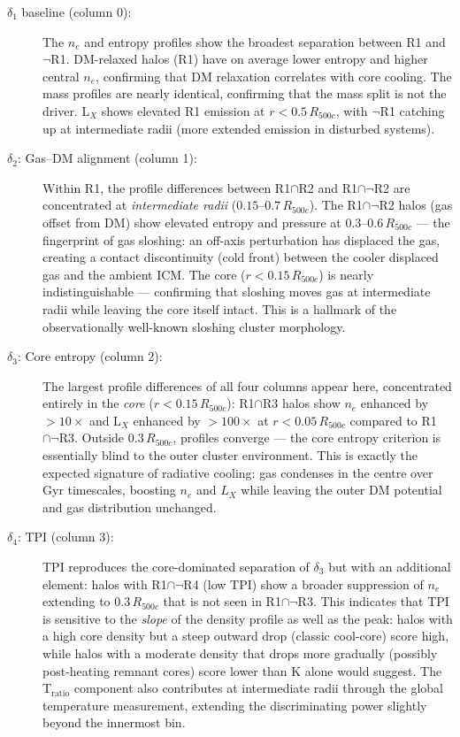 \documentclass[12pt,a4paper]{article}
\begin{document}
\begin{description}
  \item[$\delta_1$ baseline (column 0):]
    The $n_e$ and entropy profiles show the broadest separation between R1 and $\neg$R1.
    DM-relaxed halos (R1) have on average lower entropy and higher central $n_e$,
    confirming that DM relaxation correlates with core cooling.
    The mass profiles are nearly identical, confirming that the mass split
    is not the driver.
    L$_X$ shows elevated R1 emission at $r < 0.5\,R_{500c}$, with $\neg$R1 catching
    up at intermediate radii (more extended emission in disturbed systems).

  \item[$\delta_2$: Gas--DM alignment (column 1):]
    Within R1, the profile differences between R1$\cap$R2 and R1$\cap\neg$R2 are
    concentrated at \emph{intermediate radii} ($0.15$--$0.7\,R_{500c}$).
    The R1$\cap\neg$R2 halos (gas offset from DM) show elevated entropy and pressure
    at $0.3$--$0.6\,R_{500c}$ --- the fingerprint of gas sloshing: an off-axis perturbation
    has displaced the gas, creating a contact discontinuity (cold front) between the
    cooler displaced gas and the ambient ICM.
    The core ($r < 0.15\,R_{500c}$) is nearly indistinguishable --- confirming that
    sloshing moves gas at intermediate radii while leaving the core itself intact.
    This is a hallmark of the observationally well-known sloshing cluster morphology.

  \item[$\delta_3$: Core entropy (column 2):]
    The largest profile differences of all four columns appear here, concentrated
    entirely in the \emph{core} ($r < 0.15\,R_{500c}$):
    R1$\cap$R3 halos show $n_e$ enhanced by $>10\times$ and L$_X$ enhanced by
    $>100\times$ at $r < 0.05\,R_{500c}$ compared to R1$\cap\neg$R3.
    Outside $0.3\,R_{500c}$, profiles converge --- the core entropy criterion
    is essentially blind to the outer cluster environment.
    This is exactly the expected signature of radiative cooling: gas condenses
    in the centre over Gyr timescales, boosting $n_e$ and $L_X$ while leaving
    the outer DM potential and gas distribution unchanged.

  \item[$\delta_4$: TPI (column 3):]
    TPI reproduces the core-dominated separation of $\delta_3$ but with an additional
    element: halos with R1$\cap\neg$R4 (low TPI) show a broader suppression of
    $n_e$ extending to $0.3\,R_{500c}$ that is not seen in R1$\cap\neg$R3.
    This indicates that TPI is sensitive to the \emph{slope} of the density profile
    as well as the peak: halos with a high core density but a steep outward drop
    (classic cool-core) score high, while halos with a moderate density that drops
    more gradually (possibly post-heating remnant cores) score lower than K alone
    would suggest.
    The T$_\mathrm{ratio}$ component also contributes at intermediate radii through
    the global temperature measurement, extending the discriminating power slightly
    beyond the innermost bin.
\end{description}
\end{document}
